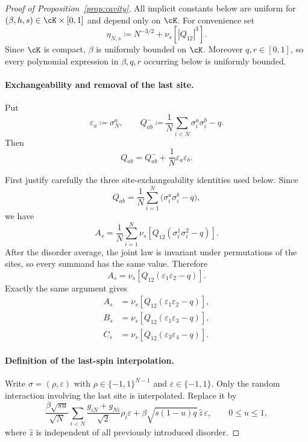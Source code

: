 \begin{proof}[Proof of Proposition~\ref{prop:cavity}]
All implicit constants below are uniform for
$(\beta,h,s)\in\cK\times[0,1]$ and depend only on $\cK$.
For convenience set
\[
 \eta_{N,s}
 \coloneqq
 N^{-3/2}+\nu_s[|Q_{12}|^3].
\]
Since $\cK$ is compact, $\beta$ is uniformly bounded on $\cK$.
Moreover $q,r\in[0,1]$, so every polynomial expression in
$\beta,q,r$ occurring below is uniformly bounded.

\paragraph{Exchangeability and removal of the last site.}

Put
\[
 \varepsilon_a\coloneqq\sigma_N^a,
 \qquad
 Q^-_{ab}
 \coloneqq
 \frac1N\sum_{i<N}\sigma_i^a\sigma_i^b-q.
\]
Then
\begin{equation}
 Q_{ab}
 =
 Q^-_{ab}+\frac1N\varepsilon_a\varepsilon_b.
 \label{eq:Qab}
\end{equation}

First justify carefully the three site-exchangeability identities used below.
Since
\[
 Q_{ab}
 =
 \frac1N\sum_{i=1}^N
 \bigl(\sigma_i^a\sigma_i^b-q\bigr),
\]
we have
\[
 A_s
 =
 \frac1N\sum_{i=1}^N
 \nu_s\!\left[
 Q_{12}(\sigma_i^1\sigma_i^2-q)
 \right].
\]
After the disorder average, the joint law is invariant under permutations of
the sites, so every summand has the same value.  Therefore
\[
 A_s
 =
 \nu_s\!\left[
 Q_{12}(\varepsilon_1\varepsilon_2-q)
 \right].
\]
Exactly the same argument gives
\begin{align}
 A_s&=\nu_s\!\left[Q_{12}(\varepsilon_1\varepsilon_2-q)\right],
 \nonumber\\
 B_s&=\nu_s\!\left[Q_{12}(\varepsilon_1\varepsilon_3-q)\right],
 \label{eq:cavity-site-exchangeability}\\
 C_s&=\nu_s\!\left[Q_{12}(\varepsilon_3\varepsilon_4-q)\right].
 \nonumber
\end{align}

\paragraph{Definition of the last-spin interpolation.}

Write $\sigma=(\rho,\varepsilon)$ with
$\rho\in\{-1,1\}^{N-1}$ and $\varepsilon\in\{-1,1\}$.
Only the random interaction involving the last site is interpolated.
Replace it by
\[
 \frac{\beta\sqrt{su}}{\sqrt N}
 \sum_{i<N}
 \frac{g_{iN}+g_{Ni}}{\sqrt2}\rho_i\varepsilon
 +
 \beta\sqrt{s(1-u)q}\,\widehat z\,\varepsilon,
 \qquad 0\le u\le1,
\]
where $\widehat z$ is independent of all previously introduced disorder.


\end{proof}
